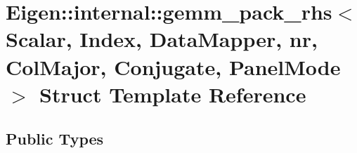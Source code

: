 \hypertarget{struct_eigen_1_1internal_1_1gemm__pack__rhs_3_01_scalar_00_01_index_00_01_data_mapper_00_01nr_00e5afdbaca90e394aa6e3c7b4d02529b6}{}\section{Eigen\+:\+:internal\+:\+:gemm\+\_\+pack\+\_\+rhs$<$ Scalar, Index, Data\+Mapper, nr, Col\+Major, Conjugate, Panel\+Mode $>$ Struct Template Reference}
\label{struct_eigen_1_1internal_1_1gemm__pack__rhs_3_01_scalar_00_01_index_00_01_data_mapper_00_01nr_00e5afdbaca90e394aa6e3c7b4d02529b6}
\subsection*{Public Types}
